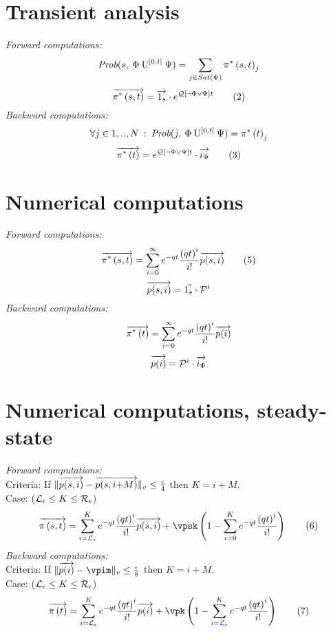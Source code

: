 \documentclass[twoside,a4paper,,10pt]{article}
\begin{document}
\section{Transient analysis}
	\emph{Forward computations:}
	\begin{equation}
		\mbox{\it Prob}(s, \: \Phi \: \mathrm{U}^{[0,t]} \: \Psi ) = \sum_{j \in Sat \left(\Psi \right)}\pi^{*} \left(s, t \right)_{j}
		\nonumber
	\end{equation}
	\begin{equation}
		\overrightarrow{\pi^{*} \left(s, t \right)} = \overrightarrow{1_{s}} \cdot e^{\mathcal{Q}\left[\lnot \Phi \vee \Psi \right] t}
		\label{eq:fsmc_base} \tag{2}
	\end{equation}
	\emph{Backward computations:}
	\begin{equation}
		\forall j \in 1,..,N\: : \: \mbox{\it Prob}(j, \: \Phi \: \mathrm{U}^{[0,t]} \: \Psi ) = \pi^{*} \left( t \right)_{j}
		\nonumber
	\end{equation}
	\begin{equation}
		\overrightarrow{\pi^{*} \left( t \right)} = e^{\mathcal{Q}\left[\lnot \Phi \vee \Psi \right] t} \cdot \overrightarrow{i_{\Psi}}
		\label{eq:fsmc_imr} \tag{3}
	\end{equation}

\section{Numerical computations}
	\emph{Forward computations:}
	\begin{equation}
		\overrightarrow{\pi^{*} \left(s, t \right)} = \sum_{i=0}^{\infty}e^{-q t}\frac{\left( q t \right)^{i}}{i!} \overrightarrow{p(s,i)}
		\label{eq:until_general} \tag{5}
	 \end{equation}
	\begin{equation}
		\overrightarrow{p(s,i)} = \vec{1_{s}} \cdot \mathcal{P}^{i}
		\nonumber
	\end{equation}
	\emph{Backward computations:}
	\begin{equation}
		\overrightarrow{\pi^{*} \left( t \right)} = \sum_{i=0}^{\infty}e^{-q t}\frac{\left( q t \right)^{i}}{i!} \overrightarrow{p(i)} \nonumber
	\end{equation}
	\begin{equation}
		\overrightarrow{p(i)} = \mathcal{P}^{i} \cdot \overrightarrow{i_{\Psi}}
		\nonumber
	\end{equation}

\section{Numerical computations, steady-state}
	\emph{Forward computations:}\\
	Criteria: If $\lVert \overrightarrow{p(s,i)} - \overrightarrow{p(s,i{+}M)} \rVert_{v} \leq \frac{\epsilon}{4}$ then $K = i + M$.\\
	Case: ($\mathcal{L}_{\epsilon} \leq K \leq \mathcal{R}_{\epsilon}$)
	\begin{equation}
		\vpist = \sum_{i=\ltp}^{K}\pnd \vpsi + \vpsk \left(1- \sum_{i=0}^{K}\pnd \right) \label{eq:ssd_LR} \tag{6}
	\end{equation}
	\emph{Backward computations:}\\
	Criteria: If $\nvec{\vpi - \vpim} \leq \frac{\epsilon}{8}$ then $K = i + M$.\\
	Case: ($\mathcal{L}_{\epsilon} \leq K \leq \mathcal{R}_{\epsilon}$)
	\begin{equation}
		\vpit = \sum_{i=\ltp}^{K}\pnd \vpi + \vpk \left(1- \sum_{{\color[rgb]{0,0,1}i=\ltp}}^{K} \pnd \right) \label{eq:ssd_LR_b} \tag{7}
	\end{equation}
\end{document}
